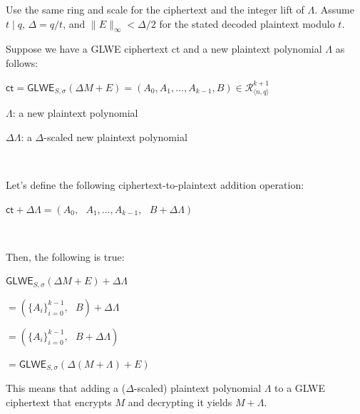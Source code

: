 Use the same ring and scale for the ciphertext and the integer lift of $\Lambda$. Assume $t\mid q$, $\Delta=q/t$, and $\|E\|_\infty<\Delta/2$ for the stated decoded plaintext modulo $t$.

Suppose we have a GLWE ciphertext \textsf{ct} and a new plaintext polynomial $\Lambda$ as follows: 


$\textsf{ct} = \textsf{GLWE}_{S, \sigma}(\Delta M + E) = ( A_0, A_1, \ldots, A_{k-1}, B) \in \mathcal{R}_{\langle n,q \rangle}^{k + 1}$

$\Lambda$: a new plaintext polynomial

$\Delta \Lambda$: a $\Delta$-scaled new plaintext polynomial

$ $

\noindent Let's define the following ciphertext-to-plaintext addition operation: 

$\textsf{ct} + \Delta\Lambda = ( A_0, \text{ } A_1, \ldots, A_{k-1}, \text{ } B + \Delta \Lambda)$

$ $

\noindent Then, the following is true:

\begin{tcolorbox}[title={\textbf{\tboxlabel{\ref*{sec:glwe-add-plain}} GLWE Homomorphic Addition with a Plaintext}}]
$\textsf{GLWE}_{S, \sigma}(\Delta M + E) + \Delta\Lambda $

$=  (\{A_i\}_{i=0}^{k-1}, \text{ } B) + \Delta\Lambda$

$=  (\{A_i\}_{i=0}^{k-1}, \text{ } B + \Delta\Lambda)$

$= \textsf{GLWE}_{S, \sigma}(\Delta (M + \Lambda) + E)$
\end{tcolorbox}


This means that adding a ($\Delta$-scaled) plaintext polynomial $\Lambda$ to a GLWE ciphertext that encrypts $M$ and decrypting it yields $M + \Lambda$. 




